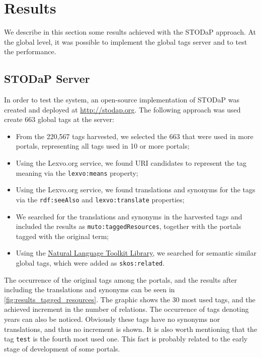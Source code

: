 \documentclass[conference]{IEEEtran}
\begin{document}
\section{Results}
\label{sec:results}

We describe in this section some results achieved with the STODaP approach.
At the global level, it was possible to implement the global tags server and to test the performance.

\subsection{STODaP Server}

In order to test the system, an open-source implementation of STODaP was created and deployed at \url{http://stodap.org}.
The following approach was used create 663 global tags at the server:
\begin{itemize}
	\item From the 220,567 tags harvested, we selected the 663 that were used in more portals, representing all tags used in 10 or more portals; 
	\item Using the Lexvo.org service, we found URI candidates to represent the tag meaning via the \texttt{lexvo:means} property;
	\item Using the Lexvo.org service, we found translations and synonyms for the tags via the \texttt{rdf:seeAlso} and \texttt{lexvo:translate} properties;
	\item We searched for the translations and synonyms in the harvested tags and included the results as \texttt{muto:taggedResources}, together with the portals tagged with the original term;
	\item Using the \href{http://www.nltk.org/}{Natural Language Toolkit  Library}, we searched for semantic similar global tags, which were added as \texttt{skos:related}.
\end{itemize}

The occurrence of the original tags among the portals, and the results after including the translations and synonyms can be seen in \autoref{fig:results_tagged_resources}. 
The graphic shows the 30 most used tags, and the achieved increment in the number of relations. 
The occurrence of tags denoting years can also be noticed.
Obviously these tags have no synonyms nor translations, and thus no increment is shown. 
It is also worth mentioning that the tag \texttt{{test}} is the fourth most used one.
This fact is probably related to the early stage of development of some portals. 
\end{document}
